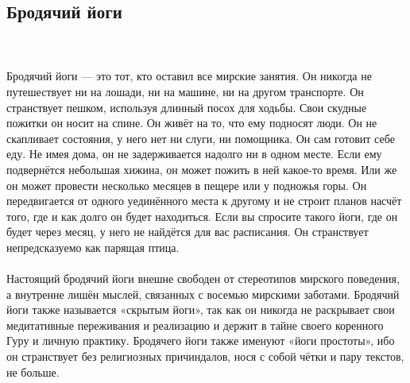 \subsection{Бродячий йоги}
\\ \\ Бродячий йоги — это тот, кто оставил все мирские занятия. Он никогда не путешествует ни на лошади, ни на машине, ни на другом транспорте. Он странствует пешком, используя длинный посох для ходьбы. Свои скудные пожитки он носит на спине. Он живёт на то, что ему подносят люди. Он не скапливает состояния, у него нет ни слуги, ни помощника. Он сам готовит себе еду. Не имея дома, он не задерживается надолго ни в одном месте. Если ему подвернётся небольшая хижина, он может пожить в ней какое-то время. Или же он может провести несколько месяцев в пещере или у подножья горы. Он передвигается от одного уединённого места к другому и не строит планов насчёт того, где и как долго он будет находиться. Если вы спросите такого йоги, где он будет через месяц, у него не найдётся для вас расписания. Он странствует непредсказуемо как парящая птица.
\\ \\ Настоящий бродячий йоги внешне свободен от стереотипов мирского поведения, а внутренне лишён мыслей, связанных с восемью мирскими заботами. Бродячий йоги также называется «скрытым йоги», так как он никогда не раскрывает свои медитативные переживания и реализацию и держит в тайне своего коренного Гуру и личную практику. Бродячего йоги также именуют «йоги простоты», ибо он странствует без религиозных причиндалов, нося с собой чётки и пару текстов, не больше.
\newpage
